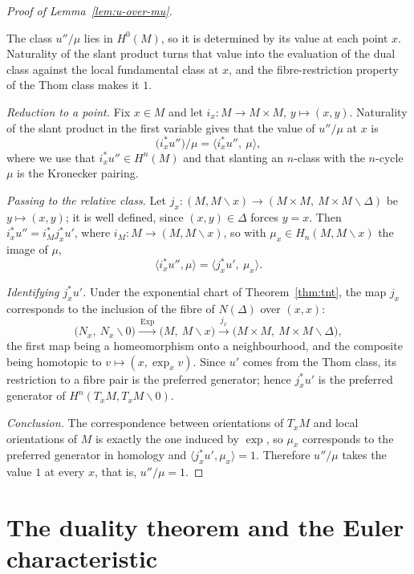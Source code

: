 \begin{proof}[Proof of Lemma~\ref{lem:u-over-mu}]
\begin{strategy}
The class $u''/\mu$ lies in $H^0(M)$, so it is determined by its value at each
point $x$. Naturality of the slant product turns that value into the evaluation
of the dual class against the local fundamental class at $x$, and the
fibre-restriction property of the Thom class makes it $1$.
\end{strategy}

 \emph{Reduction to a point.} Fix $x\in M$ and let
$i_x\colon M\to M\times M$, $y\mapsto(x,y)$. Naturality of the slant product in
the first variable gives that the value of $u''/\mu$ at $x$ is
\[
\big(i_x^*u''\big)/\mu=\big\langle i_x^*u'',\ \mu\big\rangle ,
\]
where we use that $i_x^*u''\in H^n(M)$ and that slanting an $n$-class with the
$n$-cycle $\mu$ is the Kronecker pairing.

 \emph{Passing to the relative class.} Let
$j_x\colon(M,M\smallsetminus x)\to(M\times M,\ M\times M\smallsetminus\Delta)$ be
$y\mapsto(x,y)$; it is well defined, since $(x,y)\in\Delta$ forces $y=x$. Then
$i_x^*u''=i_M^*j_x^*u'$, where $i_M\colon M\to(M,M\smallsetminus x)$, so with
$\mu_x\in H_n(M,M\smallsetminus x)$ the image of $\mu$,
\[
\big\langle i_x^*u'',\mu\big\rangle
=\big\langle j_x^*u',\ \mu_x\big\rangle .
\]

 \emph{Identifying $j_x^*u'$.} Under the exponential chart of
Theorem~\ref{thm:tnt}, the map $j_x$ corresponds to the inclusion of the fibre
of $N(\Delta)$ over $(x,x)$:
\[
\big(N_x,\ N_x\smallsetminus0\big)
\xrightarrow{\ \mathrm{Exp}\ }
\big(M,\ M\smallsetminus x\big)
\xrightarrow{\ j_x\ }
\big(M\times M,\ M\times M\smallsetminus\Delta\big),
\]
the first map being a homeomorphism onto a neighbourhood, and the composite
being homotopic to $v\mapsto(x,\exp_x v)$. Since $u'$ comes from the Thom class,
its restriction to a fibre pair is the preferred generator; hence $j_x^*u'$ is
the preferred generator of $H^n(T_xM,T_xM\smallsetminus0)$.

 \emph{Conclusion.} The correspondence between orientations of $T_xM$
and local orientations of $M$ is exactly the one induced by $\exp$, so $\mu_x$
corresponds to the preferred generator in homology and
$\langle j_x^*u',\mu_x\rangle=1$. Therefore $u''/\mu$ takes the value $1$ at
every $x$, that is, $u''/\mu=1$.
\end{proof}

\section{The duality theorem and the Euler characteristic}


